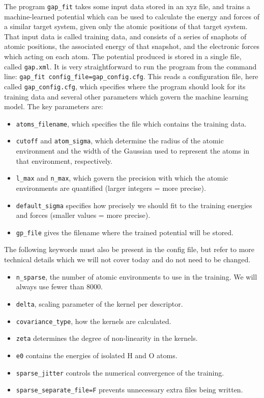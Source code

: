 \documentclass{article}
\begin{document}
The program \verb|gap_fit| takes some input data stored in an xyz file, and trains a machine-learned potential which can be used to calculate the energy and forces of a similar target system, given only the atomic positions of that target system. That input data is called training data, and consists of a series of snaphots of atomic positions, the associated energy of that snapshot, and the electronic forces which acting on each atom. The potential produced is stored in a single file, called \verb|gap.xml|. It is very straightforward to run the program from the command line: \verb|gap_fit config_file=gap_config.cfg|. This reads a configuration file, here called \verb|gap_config.cfg|, which specifies where the program should look for its training data and several other parameters which govern the machine learning model. The key parameters are:
\begin{itemize}

\item \verb|atoms_filename|, which specifies the file which contains the training data.
\item \verb|cutoff| and \verb|atom_sigma|, which determine the radius of the atomic environment and the width of the Gaussian used to represent the atoms in that environment, respectively.
\item \verb|l_max| and \verb|n_max|, which govern the precision with which the atomic environments are quantified (larger integers = more precise).
\item \verb|default_sigma| specifies how precisely we should fit to the training energies and forces (smaller values = more precise).
\item \verb|gp_file| gives the filename where the trained potential will be stored.

\end{itemize}

The following keywords must also be present in the config file, but refer to more technical details which we will not cover today and do not need to be changed.

\begin{itemize}
\item \verb|n_sparse|, the number of atomic environments to use in the training. We will always use fewer than 8000.
\item \verb|delta|, scaling parameter of the kernel per descriptor.
\item \verb|covariance_type|, how the kernels are calculated.
\item \verb|zeta| determines the degree of non-linearity in the kernels.
\item \verb|e0| contains the energies of isolated H and O atoms.
\item \verb|sparse_jitter| controls the numerical convergence of the training.
\item \verb|sparse_separate_file=F| prevents unnecessary extra files being written. 
\end{itemize}
\end{document}
